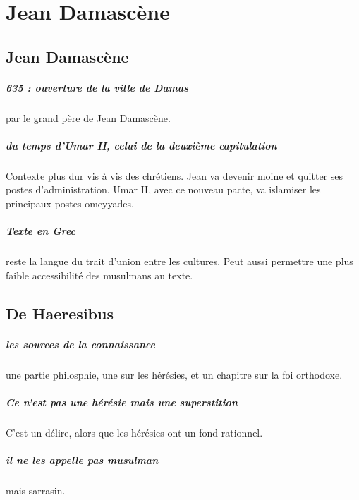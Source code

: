 \chapter{Jean Damascène}

\section{Jean Damascène}

\paragraph{635 : ouverture de la ville de Damas} par le grand père de Jean Damascène.  

\paragraph{du temps d'Umar II, celui de la deuxième capitulation} Contexte plus dur vis à vis des chrétiens. Jean va devenir moine et quitter ses postes d'administration. Umar II, avec ce nouveau pacte, va islamiser les principaux postes omeyyades. 

\paragraph{Texte en Grec} reste la langue du trait d'union entre les cultures. Peut aussi permettre une plus faible accessibilité des musulmans au texte.


\section{De Haeresibus}
\paragraph{les sources de la connaissance} une partie philosphie, une sur les hérésies, et un chapitre sur la foi orthodoxe.


\paragraph{Ce n'est pas une hérésie mais une superstition} C'est un délire, alors que les hérésies ont un fond rationnel.

\paragraph{il ne les appelle pas musulman} mais sarrasin. 

